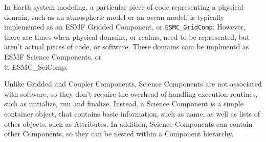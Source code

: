 %


\label{sec:SciComp}

In Earth system modeling, a particular piece of code representing a physical 
domain, such as an atmospheric model or an ocean model, is typically 
implemented as an ESMF Gridded Component, or {\tt ESMC\_GridComp}.  
However, there are times when physical domains, or realms, need to be 
represented, but aren't actual pieces of code, or software.  These domains 
cam be implmentd as ESMF Science Components, or {\\tt ESMC_SciComp}.

Unlike Gridded and Coupler Components, Science Components are not associated 
with software, so they don't require the overhead of handling execution 
routines, such as initialize, run and finalize.  Instead, a Science Component 
is a simple container object, that contains basic information, such as name,
as well as lists of other objects, such as Attributes.  In addition, Science
Components can contain other Components, so they can be nested within a
Component hierarchy.

